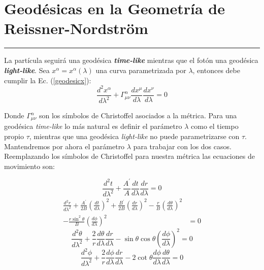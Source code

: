\section{\huge{Geodésicas en la Geometría de Reissner-Nordström}}

\textcolor{myred}{\hrule}

 La partícula seguirá una geodésica \textbf{\textit{time-like}} mientras que el fotón una geodésica \textbf{\textit{light-like}}. Sea $x^\alpha = x^\alpha (\lambda)$ una curva parametrizada por $\lambda$, entonces debe cumplir la Ec. (\ref{geodesicx}):
\begin{equation}
    \frac{d^2 x^\alpha}{d \lambda^2} + \Gamma^\alpha_{\mu\nu} \frac{d x^\mu}{d \lambda} \frac{d x^\nu}{d \lambda} = 0
\end{equation}

Donde $\Gamma^\alpha_{\mu\nu}$ son los símbolos de Christoffel asociados a la métrica. Para una geodésica \textit{time-like} lo más natural es definir el parámetro $\lambda$ como el tiempo propio $\tau$, mientras que una geodésica \textit{light-like} no puede parametrizarse con $\tau$. Mantendremos por ahora el parámetro $\lambda$ para trabajar con los dos casos. Reemplazando los símbolos de Christoffel para nuestra métrica las ecuaciones de movimiento son:
 
\begin{equation}
    \frac{d^2 t}{d \lambda^2} + \frac{A^\prime}{A} \frac{d t}{d \lambda} \frac{d r}{d \lambda} = 0
\label{eqt3.1}
\end{equation}
\begin{equation}
\begin{split}
    \frac{d^2 r}{d \lambda^2} + \frac{A^\prime}{2B} \left(\frac{d t}{d \lambda}\right)^2 + \frac{B^\prime}{2B} \left(\frac{d r}{d \lambda}\right)^2 - \frac{r}{B} \left(\frac{d \theta}{d \lambda}\right)^2 &\\- \frac{r \sin^2{\theta}}{B} \left(\frac{d \phi}{d \lambda}\right)^2 &= 0
\label{eqradial3.1}
\end{split}
\end{equation}
\begin{equation}
    \frac{d^2 \theta}{d \lambda^2} + \frac{2}{r} \frac{d \theta}{d \lambda} \frac{d r}{d \lambda} - \sin{\theta}\cos{\theta} \left(\frac{d \phi}{d \lambda}\right)^2= 0
\end{equation}
\begin{equation}
    \frac{d^2 \phi}{d \lambda^2} + \frac{2}{r} \frac{d \phi}{d \lambda} \frac{d r}{d \lambda} - 2\cot{\theta}\frac{d \phi}{d \lambda} \frac{d \theta}{d \lambda}= 0
\label{eqazimutal3.1}
\end{equation}

